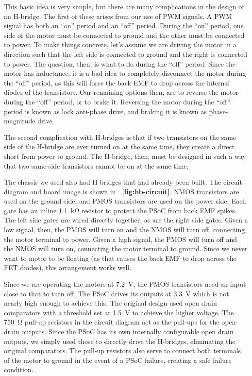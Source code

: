 \documentclass[letterpaper, 11pt]{article}
\newcommand*{\figref}[1]{\textbf{\figurename~\ref{#1}}}
\begin{document}
This basic idea is very simple, but there are many complications in the design of an H-bridge. The first of these arises from our use of PWM signals. A PWM signal has both an ``on'' period and an ``off'' period. During the ``on'' period, one side of the motor must be connected to ground and the other must be connected to power. To make things concrete, let's assume we are driving the motor in a direction such that the left side is connected to ground and the right is connected to power. The question, then, is what to do during the ``off'' period. Since the motor has inductance, it is a bad idea to completely disconnect the motor during the ``off'' period, as this will force the back EMF to drop across the internal diodes of the transistors. Our remaining options then, are to reverse the motor during the ``off'' period, or to brake it. Reversing the motor during the ``off'' period is known as lock anti-phase drive, and braking it is known as phase-magnitude drive.

The second complication with H-bridges is that if two transistors on the same side of the H-bridge are ever turned on at the same time, they create a direct short from power to ground. The H-bridge, then, must be designed in such a way that two same-side transistors cannot be on at the same time.

The chassis we used also had H-bridges that had already been built. The circuit diagram and board image is shown in \figref{fig:hb-circuit}. NMOS transistors are used on the ground side, and PMOS transistors are used on the power side. Each gate has an inline \SI{1.1}{\kilo\ohm} resistor to protect the PSoC from back EMF spikes. The left side gates are wired directly together, as are the right side gates. Given a low signal, then, the PMOS will turn on and the NMOS will turn off, connecting the motor terminal to power. Given a high signal, the PMOS will turn off and the NMOS will turn on, connecting the motor terminal to ground. Since we never want to motor to be floating (as that causes the back EMF to drop across the FET diodes), this arrangement works well.

Since we are operating the motors at \SI{7.2}{\volt}, the PMOS transistors need an input close to that to turn off. The PSoC drives its outputs at \SI{3.3}{\volt} which is not nearly high enough to achieve this. The original design used open drain comparators with a threshold set at \SI{1.5}{\volt} to achieve the higher voltage. The \SI{750}{\ohm} pull-up resistors in the circuit diagram act as the pull-ups for the open-drain outputs. Since the PSoC has its own internally configurable open drain outputs, we simply used those to directly drive the H-bridges, eliminating the original comparators. The pull-up resistors also serve to connect both terminals of the motor to ground in the event of a PSoC failure, creating a safe failure condition.
\end{document}
